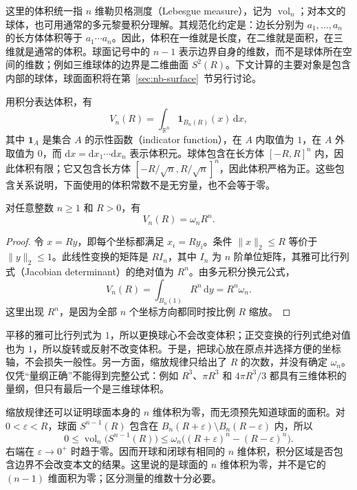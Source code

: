 \documentclass[UTF8]{ctexart}
\begin{document}
这里的体积统一指 $n$ 维勒贝格测度（Lebesgue measure），记为 $\operatorname{vol}_n$；对本文的球体，也可用通常的多元黎曼积分理解。其规范化约定是：边长分别为 $a_1,\ldots,a_n$ 的长方体体积等于 $a_1\cdots a_n$。因此，体积在一维就是长度，在二维就是面积，在三维就是通常的体积。球面记号中的 $n-1$ 表示边界自身的维数，而不是球体所在空间的维数；例如三维球体的边界是二维曲面 $S^2(R)$。下文计算的主要对象是包含内部的球体，球面面积将在第~\ref{sec:nb-surface}~节另行讨论。

用积分表达体积，有
\[
  V_n(R)=\int_{\mathbb R^n}\mathbf1_{B_n(R)}(x)\,\mathrm dx,
\]
其中 $\mathbf1_A$ 是集合 $A$ 的示性函数（indicator function），在 $A$ 内取值为 $1$，在 $A$ 外取值为 $0$，而 $\mathrm dx=\mathrm dx_1\cdots\mathrm dx_n$ 表示体积元。球体包含在长方体 $[-R,R]^n$ 内，因此体积有限；它又包含长方体 $[-R/\sqrt n,R/\sqrt n]^n$，因此体积严格为正。这些包含关系说明，下面使用的体积常数不是无穷量，也不会等于零。

\begin{proposition}[半径的缩放规律]\label{prop:nb-scaling}
对任意整数 $n\geq1$ 和 $R>0$，有
\begin{equation}\label{eq:nb-scaling}
  V_n(R)=\omega_nR^n.
\end{equation}
\end{proposition}

\begin{proof}
令 $x=Ry$，即每个坐标都满足 $x_i=Ry_i$。条件 $\|x\|_2\leq R$ 等价于 $\|y\|_2\leq1$。此线性变换的矩阵是 $RI_n$，其中 $I_n$ 为 $n$ 阶单位矩阵，其雅可比行列式（Jacobian determinant）的绝对值为 $R^n$。由多元积分换元公式，
\[
  V_n(R)=\int_{B_n(1)}R^n\,\mathrm dy=R^n\omega_n.
\]
这里出现 $R^n$，是因为全部 $n$ 个坐标方向都同时按比例 $R$ 缩放。
\end{proof}

平移的雅可比行列式为 $1$，所以更换球心不会改变体积；正交变换的行列式绝对值也为 $1$，所以旋转或反射不改变体积。于是，把球心放在原点并选择方便的坐标轴，不会损失一般性。另一方面，缩放规律只给出了 $R$ 的次数，并没有确定 $\omega_n$。仅凭“量纲正确”不能得到完整公式：例如 $R^3$、$\pi R^3$ 和 $4\pi R^3/3$ 都具有三维体积的量纲，但只有最后一个是三维球体积。

缩放规律还可以证明球面本身的 $n$ 维体积为零，而无须预先知道球面的面积。对 $0<\varepsilon<R$，球面 $S^{n-1}(R)$ 包含在 $B_n(R+\varepsilon)\setminus B_n(R-\varepsilon)$ 内，所以
\[
  0\leq\operatorname{vol}_n\bigl(S^{n-1}(R)\bigr)
  \leq\omega_n\bigl((R+\varepsilon)^n-(R-\varepsilon)^n\bigr).
\]
右端在 $\varepsilon\to0^+$ 时趋于零。因而开球和闭球有相同的 $n$ 维体积，积分区域是否包含边界不会改变本文的结果。这里说的是球面的 $n$ 维体积为零，并不是它的 $(n-1)$ 维面积为零；区分测量的维数十分必要。
\end{document}
